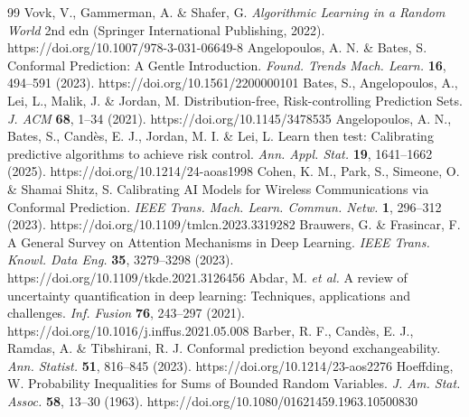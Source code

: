 \begin{thebibliography}{99}
 Vovk, V., Gammerman, A. \& Shafer, G. \emph{Algorithmic Learning in a Random World} 2nd edn (Springer International Publishing, 2022). https://doi.org/10.1007/978-3-031-06649-8
 Angelopoulos, A. N. \& Bates, S. Conformal Prediction: A Gentle Introduction. \emph{Found. Trends Mach. Learn.} \textbf{16}, 494--591 (2023). https://doi.org/10.1561/2200000101
 Bates, S., Angelopoulos, A., Lei, L., Malik, J. \& Jordan, M. Distribution-free, Risk-controlling Prediction Sets. \emph{J. ACM} \textbf{68}, 1--34 (2021). https://doi.org/10.1145/3478535
 Angelopoulos, A. N., Bates, S., Candès, E. J., Jordan, M. I. \& Lei, L. Learn then test: Calibrating predictive algorithms to achieve risk control. \emph{Ann. Appl. Stat.} \textbf{19}, 1641--1662 (2025). https://doi.org/10.1214/24-aoas1998
 Cohen, K. M., Park, S., Simeone, O. \& Shamai Shitz, S. Calibrating AI Models for Wireless Communications via Conformal Prediction. \emph{IEEE Trans. Mach. Learn. Commun. Netw.} \textbf{1}, 296--312 (2023). https://doi.org/10.1109/tmlcn.2023.3319282
 Brauwers, G. \& Frasincar, F. A General Survey on Attention Mechanisms in Deep Learning. \emph{IEEE Trans. Knowl. Data Eng.} \textbf{35}, 3279--3298 (2023). https://doi.org/10.1109/tkde.2021.3126456
 Abdar, M. \emph{et al.} A review of uncertainty quantification in deep learning: Techniques, applications and challenges. \emph{Inf. Fusion} \textbf{76}, 243--297 (2021). https://doi.org/10.1016/j.inffus.2021.05.008
 Barber, R. F., Candès, E. J., Ramdas, A. \& Tibshirani, R. J. Conformal prediction beyond exchangeability. \emph{Ann. Statist.} \textbf{51}, 816--845 (2023). https://doi.org/10.1214/23-aos2276
 Hoeffding, W. Probability Inequalities for Sums of Bounded Random Variables. \emph{J. Am. Stat. Assoc.} \textbf{58}, 13--30 (1963). https://doi.org/10.1080/01621459.1963.10500830
\end{thebibliography}
